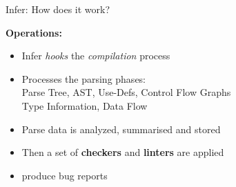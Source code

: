 \begin{frame}{Infer: How does it work?}

\textbf{Operations:}

\begin{itemize}
	\item Infer \textit{hooks} the \textit{compilation} process
	\item Processes the parsing phases: \\Parse Tree, AST, Use-Defs, Control Flow Graphs\\
	Type Information, Data Flow
	\item Parse data is analyzed, summarised and stored
	\item Then a set of \textbf{checkers} and \textbf{linters} are applied 
	\item produce bug reports
\end{itemize}

\end{frame}